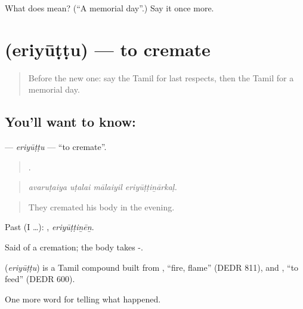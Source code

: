 \begin{tcolorbox}[breakable,colback=teal!4,colframe=teal!35!black,title={Before you move on}]
What does  mean? (\textquotedblleft{}A memorial day\textquotedblright{}.) Say it once more.
\end{tcolorbox}
\section[\texorpdfstring{\ta{எரியூட்டு} (eriyūṭṭu)}{எரியூட்டு (eriyūṭṭu)}]{ (eriyūṭṭu) — to cremate}

\label{lesson:TA-C324-eriyuttu}



\begin{quote}
Before the new one: say the Tamil for last respects, then the Tamil for a memorial day.
\end{quote}

\subsection*{You'll want to know: }
\textbf{} — \emph{eriyūṭṭu} — \textquotedblleft{}to cremate\textquotedblright{}.

\begin{quote}
   .
\end{quote}

\begin{quote}
\emph{avaruṭaiya uṭalai mālaiyil eriyūṭṭiṉārkaḷ.}
\end{quote}

\begin{quote}
They cremated his body in the evening.
\end{quote}

Past (I …): , \emph{eriyūṭṭiṉēṉ}.

Said of a cremation; the body takes -.

\begin{cousinweb}
\textbf{} (\emph{eriyūṭṭu}) is a Tamil compound built from , \textquotedblleft{}fire, flame\textquotedblright{} (DEDR 811), and , \textquotedblleft{}to feed\textquotedblright{} (DEDR 600).
\end{cousinweb}

\begin{grammarlens}[title={What you've built}]
One more word for telling what happened.
\end{grammarlens}

